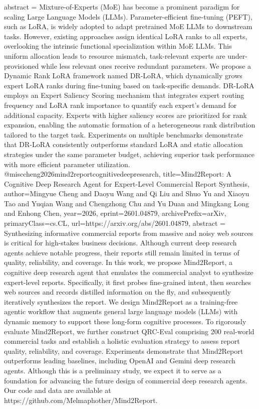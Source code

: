 {      abstract = {Mixture-of-Experts (MoE) has become a prominent paradigm for scaling Large Language Models (LLMs). Parameter-efficient fine-tuning (PEFT), such as LoRA, is widely adopted to adapt pretrained MoE LLMs to downstream tasks. However, existing approaches assign identical LoRA ranks to all experts, overlooking the intrinsic functional specialization within MoE LLMs. This uniform allocation leads to resource mismatch, task-relevant experts are under-provisioned while less relevant ones receive redundant parameters. We propose a Dynamic Rank LoRA framework named DR-LoRA, which dynamically grows expert LoRA ranks during fine-tuning based on task-specific demands. DR-LoRA employs an Expert Saliency Scoring mechanism that integrates expert routing frequency and LoRA rank importance to quantify each expert's demand for additional capacity. Experts with higher saliency scores are prioritized for rank expansion, enabling the automatic formation of a heterogeneous rank distribution tailored to the target task. Experiments on multiple benchmarks demonstrate that DR-LoRA consistently outperforms standard LoRA and static allocation strategies under the same parameter budget, achieving superior task performance with more efficient parameter utilization.}
}@misc{cheng2026mind2reportcognitivedeepresearch,
      title={Mind2Report: A Cognitive Deep Research Agent for Expert-Level Commercial Report Synthesis}, 
      author={Mingyue Cheng and Daoyu Wang and Qi Liu and Shuo Yu and Xiaoyu Tao and Yuqian Wang and Chengzhong Chu and Yu Duan and Mingkang Long and Enhong Chen},
      year={2026},
      eprint={2601.04879},
      archivePrefix={arXiv},
      primaryClass={cs.CL},
      url={https://arxiv.org/abs/2601.04879},
      abstract = {Synthesizing informative commercial reports from massive and noisy web sources is critical for high-stakes business decisions. Although current deep research agents achieve notable progress, their reports still remain limited in terms of quality, reliability, and coverage. In this work, we propose Mind2Report, a cognitive deep research agent that emulates the commercial analyst to synthesize expert-level reports. Specifically, it first probes fine-grained intent, then searches web sources and records distilled information on the fly, and subsequently iteratively synthesizes the report. We design Mind2Report as a training-free agentic workflow that augments general large language models (LLMs) with dynamic memory to support these long-form cognitive processes. To rigorously evaluate Mind2Report, we further construct QRC-Eval comprising 200 real-world commercial tasks and establish a holistic evaluation strategy to assess report quality, reliability, and coverage. Experiments demonstrate that Mind2Report outperforms leading baselines, including OpenAI and Gemini deep research agents. Although this is a preliminary study, we expect it to serve as a foundation for advancing the future design of commercial deep research agents. Our code and data are available at https://github.com/Melmaphother/Mind2Report.}
}
